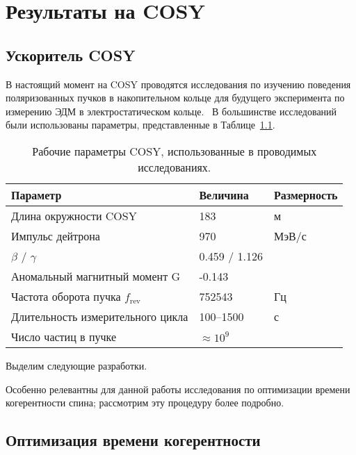 \chapter{Результаты на COSY}\label{chpt4:top-level}

\section{Ускоритель COSY}


В настоящий момент на COSY проводятся исследования по изучению поведения поляризованных пучков в накопительном кольце для будущего эксперимента по измерению ЭДМ в электростатическом кольце.~\cite{Lehrach:Precursor2012, Lehrach:IPAC15, COSY:SpinTuneMapping, Eversmann:SpinTuneMeasurement, COSY:SCT:1000sec, Wagner:BBA2018}
В большинстве исследований были использованы параметры, представленные в Таблице~\ref{tbl:COSY-studies}.

\begin{table}[h]\centering
	\caption{Рабочие параметры COSY, использованные в проводимых исследованиях.\label{tbl:COSY-studies}}
	\begin{tabular}{lll}
		\toprule
		Параметр & Величина & Размерность \\
		\midrule
		Длина окружности COSY& 183 & м\\
		Импульс дейтрона & 970 & МэВ/с \\
		 $\beta$ / $\gamma$ & 0.459 / 1.126 & \\
		 Аномальный магнитный момент G& -0.143& \\
		 Частота оборота пучка $f_{\mathrm{rev}}$& 752543& Гц\\
		 Длительность измерительного цикла& 100--1500& с\\
		 Число частиц в пучке & $\approx 10^9$& \\
		 \bottomrule
	\end{tabular}
\end{table}

Выделим следующие разработки.


Особенно релевантны для данной работы исследования по оптимизации времени когерентности спина; рассмотрим эту процедуру более подробно.
\section{Оптимизация времени когерентности}\label{sec:COSY:SCT-optimization}



\clearpage
